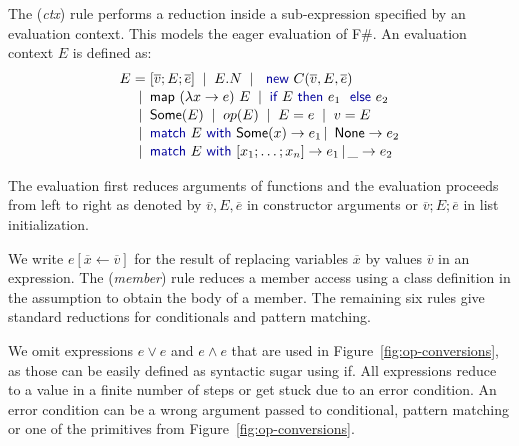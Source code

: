 \documentclass[10pt,preprint,blind,clearpagebib]{sigplanconf}
\newcommand{\kvd}[1]{\textnormal{\textcolor{kvdclr}{\sffamily #1}}}
\newcommand{\ident}[1]{\textnormal{\sffamily #1}}
\newcommand{\lsep}[0]{\;\; | \;\;}
\newcommand{\narrow}[1]{\hspace{-0.7em} #1 \hspace{-0.7em}}
\begin{document}
The (\emph{ctx}) rule performs a reduction inside a sub-expression specified by an evaluation context.
This models the eager evaluation of F\#. An evaluation context $E$ is defined as:
%
\begin{equation*}
\begin{array}{rcl}
 E &\narrow{=}& [\overline{v};E;\overline{e}] \lsep E.N \lsep \kvd{new}~C(\overline{v}, E, \overline{e})\\[0.1em]
   &\narrow{|}& \ident{map}~(\lambda x\rightarrow e)~E \lsep \kvd{if}~E~\kvd{then}~e_1~\kvd{else}~e_2 \\[0.1em]
   &\narrow{|}& \ident{Some}(E) \lsep op(E) \lsep E = e \lsep v = E \\[0.1em]
   &\narrow{|}& \kvd{match}~E~\kvd{with}~\ident{Some}(x) \rightarrow e_1 \,|\, \ident{None} \rightarrow e_2 \\[0.1em]
   &\narrow{|}& \kvd{match}~E~\kvd{with}~[x_1; \ldots; x_n] \rightarrow e_1 \,|\, \_ \rightarrow e_2
\end{array} 
\end{equation*}

\noindent
The evaluation first reduces arguments of functions and the evaluation proceeds from left to right 
as denoted by $\overline{v}, E, \overline{e}$ in constructor arguments or $\overline{v};E;\overline{e}$
in list initialization.

We write $e[\overline{x} \leftarrow \overline{v}]$ for the result of replacing variables $\overline{x}$ by
values $\overline{v}$ in an expression. The (\emph{member}) rule reduces a member access using a class 
definition in the assumption to obtain the body of a member. The remaining six rules
give standard reductions for conditionals and pattern matching.

We omit expressions $e \vee e$ and $e \wedge e$ that are used in Figure~\ref{fig:op-conversions}, 
as those can be easily defined as syntactic sugar using \kvd{if}. All expressions reduce to a value in a 
finite number of steps or get stuck due to an error condition. An error condition can be a wrong 
argument passed to conditional, pattern matching or one of the primitives from Figure~\ref{fig:op-conversions}.

\end{document}
